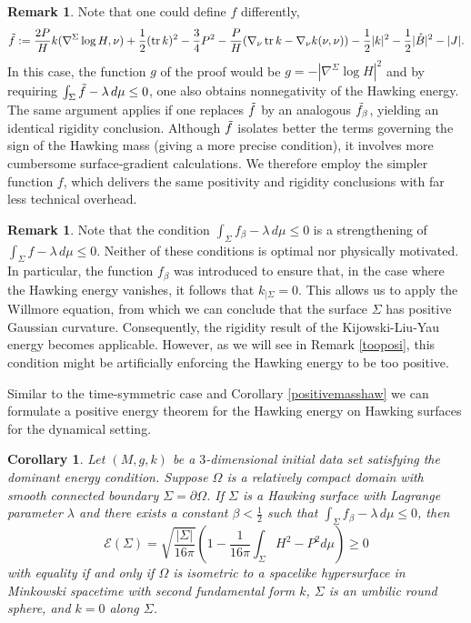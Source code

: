 \documentclass[12pt,a4paper]{amsart}
\theoremstyle{plain}
\newtheorem{corollary}[theorem]{Corollary}
\theoremstyle{definition}
\newtheorem{remark}[theorem]{Remark}
\newcommand{\tr}{\operatorname{tr}}
\begin{document}
\begin{remark}\label{remarf}
    Note that one could define $f$ differently, 
\begin{equation}\label{ftil}
    \Tilde{f}:= \frac{2P}{H}  k(\nabla^\Sigma \log H, \nu)+ \frac{1}{2 }(\tr k)^2    - \frac{3}{4} P^2- \frac{P}{H}( \nabla_\nu \tr k - \nabla_\nu k(\nu,\nu )) -  \frac{1}{2} |k|^2  -\frac{1}{2} |\mathring{B}|^2 -|J|.
\end{equation}
In this case, the function $g$ of the proof would be $g=-|\nabla^\Sigma  \log H|^2 $ and 
 by requiring $\int_\Sigma \Tilde{f} -\lambda \,d\mu \leq 0$, one also obtains nonnegativity of the Hawking energy. The same argument applies if one replaces $ \Tilde{f}$ by an  analogous   $ \Tilde{f}_{\beta}$, yielding an identical rigidity conclusion. Although $\Tilde{f}$ isolates better the terms governing the sign of the Hawking mass (giving a more precise condition), it involves more cumbersome surface‐gradient calculations. We therefore employ the simpler function 
$f$, which delivers the same positivity and rigidity conclusions with far less technical overhead.
\end{remark}
\begin{remark}
    Note that the condition \( \int_\Sigma f_\beta -\lambda \, d\mu \leq 0 \) is a strengthening of \( \int_\Sigma f -\lambda \, d\mu \leq 0 \). Neither of these conditions is optimal nor physically motivated. In particular, the function $f_\beta$ was introduced to ensure that, in the case where the Hawking energy vanishes, it follows that  $k_{|\Sigma}=0$. This allows us to apply the Willmore equation, from which we can conclude that the surface $\Sigma$ has positive Gaussian curvature. Consequently, the rigidity result of the Kijowski-Liu-Yau energy becomes applicable. However, as we will see in Remark \ref{tooposi}, this condition might be artificially enforcing the Hawking energy to be too positive.
\end{remark}
Similar to the time-symmetric case and Corollary \ref{positivemasshaw} we can formulate a positive energy theorem for the Hawking energy on Hawking surfaces for the dynamical setting. 
\begin{corollary}\label{positivemasshawdyn}
  Let $(M,g,k)$ be a $3$-dimensional initial data set satisfying the dominant energy condition. Suppose $\Omega$ is a relatively compact domain with smooth connected boundary  $\Sigma=  \partial \Omega $. If $\Sigma$ is a  Hawking surface with Lagrange parameter $\lambda$ and there exists a constant $\beta <\frac{1}{2}$ such that $\int_\Sigma f_\beta -\lambda \, d\mu \leq 0$, then
  $$  \mathcal{E}(\Sigma) = \sqrt{\frac{|\Sigma|}{16 \pi}} \left( 1- \frac{1}{16 \pi} \int_\Sigma H^2-P^2  d\mu \right) \geq 0 $$
  with equality if and only if $\Omega$ is isometric to a spacelike hypersurface  in Minkowski spacetime with second fundamental form $k$, $\Sigma$ is an umbilic round sphere, and $k=0$ along $\Sigma$.  
\end{corollary}
\end{document}
